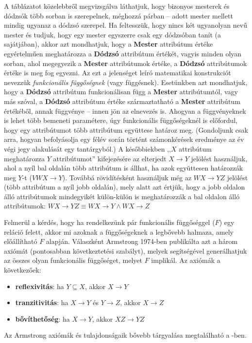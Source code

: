 %
A táblázatot közelebbről megvizsgálva láthatjuk, hogy bizonyos mesterek és dódzsók több sorban is szerepelnek, méghozzá párban -- adott mester mellett mindig ugyanaz a dódzsó szerepel.
Ha feltesszük, hogy nincs két ugyanolyan nevű mester és tudjuk, hogy egy mester egyszerre csak egy dódzsóban tanít (a sajátjában), akkor azt mondhatjuk, hogy a \textbf{Mester} attribútum értéke egyértelműen meghatározza a \textbf{Dódzsó} attribútum értékét, vagyis minden olyan sorban, ahol megegyezik a \textbf{Mester} attribútumok értéke, a \textbf{Dódzsó} attribútumok értéke is meg fog egyezni.
Az ezt a jelenséget leíró matematikai konstrukciót nevezzük \emph{funkcionális függőségnek} (vagy függésnek)\cite{Gajdos06}.
Esetünkben azt mondhatjuk, hogy a \textbf{Dódzsó} attribútum funkcionálisan függ a \textbf{Mester} attribútumtól, vagy más szóval, a \textbf{Dódzsó} attribútum értéke származtatható a \textbf{Mester} attribútum értékéből, annak függvénye -- innen jön az elnevezés is.
Ahogyan a függvényeknek is lehet több bemeneti paramétere, úgy funkcionális függőségeknél is előfordul, hogy egy attribútumot több attribútum együttese határoz meg. (Gondoljunk csak arra, hogyan befolyásolja egy félév során történt számonkérések eredménye az év végi jegy alakulását egy tantárgyból.)
A későbbiekben ,,$X$ attribútum meghatározza $Y$ attribútumot'' kifejezésére az elterjedt $X \rightarrow Y$ jelölést használjuk, ahol a nyíl bal oldalán több attribútum is állhat, ha azok együttesen határozzák meg $Y$-t ($VWX \rightarrow Y$). Továbbá rövidítésként használjuk még az $WX \rightarrow YZ$ jelölést (több attribútum a nyíl jobb oldalán), mely alatt azt értjük, hogy a jobb oldalon álló attribútumok mindegyikét külön-külön is meghatározzák a bal oldalon álló attribútumok: $WX \rightarrow YZ \equiv WX \rightarrow Y \wedge WX \rightarrow Z$

Felmerül a kérdés, hogy ha rendelkezünk pár funkcionális függőséggel ($F$) egy reláció felett, akkor mi azoknak a függőségeknek a legbővebb halmaza, amely előállítható $F$ alapján.
Válaszként Armstrong 1974-ben publikálta azt a három axiómát (pontosabban következtetési szabályt), melyek segítségével generálhatjuk az összes olyan funkcionális függőséget, melyet $F$ implikál.
Az axiómák a következőek:
\begin{itemize}
    \item \textbf{reflexivitás}: ha $Y \subseteq X$, akkor $X \rightarrow Y$
    \item \textbf{tranzitivitás}: ha $X \rightarrow Y$ és $Y \rightarrow Z$, akkor $X \rightarrow Z$
    \item \textbf{bővíthetőség}: ha $X \rightarrow Y$, akkor $XZ \rightarrow YZ$
\end{itemize}
Az Armstrong axiómák és tulajdonságaik bővebb tárgyalása megtalálható a \cite{Gajdos06}-ben.

